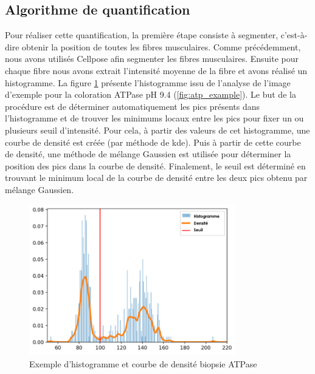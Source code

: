 \subsection{Algorithme de quantification}
Pour réaliser cette quantification, la première étape consiste à segmenter, c'est-à-dire obtenir la position de toutes les fibres musculaires. Comme précédemment, nous avons utilisés Cellpose afin segmenter les fibres musculaires. Ensuite pour chaque fibre nous avons extrait l'intensité moyenne de la fibre et avons réalisé un histogramme. La figure \ref{fig:atp_density} présente l'histogramme issu de l'analyse de l'image d'exemple pour la coloration ATPase pH 9.4 (\ref{fig:atp_example}). Le but de la procédure est de déterminer automatiquement les pics présents dans l'histogramme et de trouver les minimums locaux entre les pics pour fixer un ou plusieurs seuil d'intensité. Pour cela, à partir des valeurs de cet histogramme, une courbe de densité est créée (par méthode de \gls{kde}). Puis à partir de cette courbe de densité, une méthode de mélange Gaussien est utilisée pour déterminer la position des pics dans la courbe de densité. Finalement, le seuil est déterminé en trouvant le minimum local de la courbe de densité entre les deux pics obtenu par mélange Gaussien.
\begin{figure}[htbp]
 \centering
 \includegraphics[width=0.8\textwidth]{figures/density_plot.png}
 \caption[Exemple d'histogramme et courbe de densité biopsie ATPase]{Exemple d'histogramme et courbe de densité biopsie ATPase}
 \label{fig:atp_density}
\end{figure}

